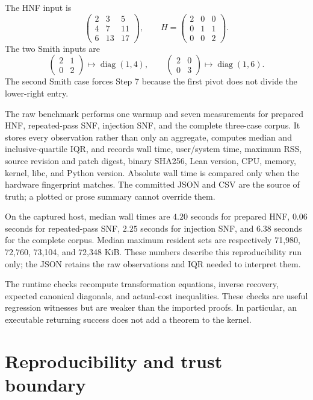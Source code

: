 \documentclass[11pt]{article}
\begin{document}
The HNF input is
\[
\begin{pmatrix}2&3&5\\4&7&11\\6&13&17\end{pmatrix},
\qquad
H=\begin{pmatrix}2&0&0\\0&1&1\\0&0&2\end{pmatrix}.
\]
The two Smith inputs are
\[
\begin{pmatrix}2&1\\0&2\end{pmatrix}
  \longmapsto \operatorname{diag}(1,4),
\qquad
\begin{pmatrix}2&0\\0&3\end{pmatrix}
  \longmapsto \operatorname{diag}(1,6).
\]
The second Smith case forces Step 7 because the first pivot does not divide
the lower-right entry.

The raw benchmark performs one warmup and seven measurements for prepared
HNF, repeated-pass SNF, injection SNF, and the complete three-case corpus.  It
stores every observation rather than only an aggregate, computes median and
inclusive-quartile IQR, and records wall time, user/system time, maximum RSS,
source revision and patch digest, binary SHA256, Lean version, CPU, memory,
kernel, libc, and Python version.  Absolute wall time is compared only when
the hardware fingerprint matches.  The committed JSON and CSV are the source
of truth; a plotted or prose summary cannot override them.

On the captured host, median wall times are \(4.20\) seconds for prepared HNF,
\(0.06\) seconds for repeated-pass SNF, \(2.25\) seconds for injection SNF,
and \(6.38\) seconds for the complete corpus.  Median maximum resident sets
are respectively 71,980, 72,760, 73,104, and 72,348 KiB.  These numbers
describe this reproducibility run only; the JSON retains the raw observations
and IQR needed to interpret them.

The runtime checks recompute transformation equations, inverse recovery,
expected canonical diagonals, and actual-cost inequalities.  These checks are
useful regression witnesses but are weaker than the imported proofs.  In
particular, an executable returning success does not add a theorem to the
kernel.

\section{Reproducibility and trust boundary}
\end{document}

